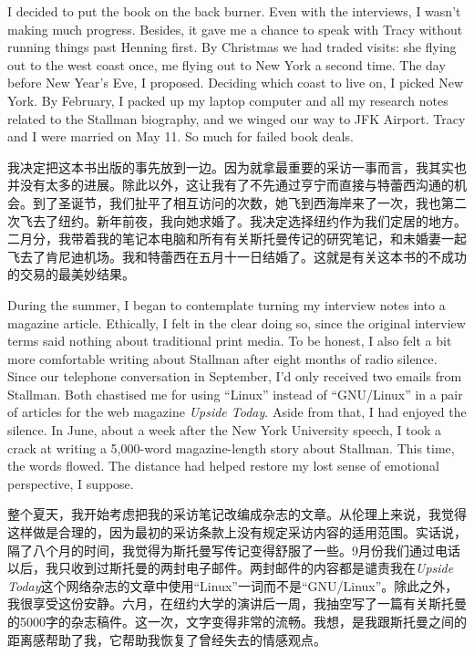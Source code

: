 \ifdefined\eng
I decided to put the book on the back burner. Even with the interviews, I wasn't making much progress. Besides, it gave me a chance to speak with Tracy without running things past Henning first. By Christmas we had traded visits: she flying out to the west coast once, me flying out to New York a second time. The day before New Year's Eve, I proposed. Deciding which coast to live on, I picked New York. By February, I packed up my laptop computer and all my research notes related to the Stallman biography, and we winged our way to JFK Airport. Tracy and I were married on May 11. So much for failed book deals.
\fi

\ifdefined\chs
我决定把这本书出版的事先放到一边。因为就拿最重要的采访一事而言，我其实也并没有太多的进展。除此以外，这让我有了不先通过亨宁而直接与特蕾西沟通的机会。到了圣诞节，我们扯平了相互访问的次数，她飞到西海岸来了一次，我也第二次飞去了纽约。新年前夜，我向她求婚了。我决定选择纽约作为我们定居的地方。二月分，我带着我的笔记本电脑和所有有关斯托曼传记的研究笔记，和未婚妻一起飞去了肯尼迪机场。我和特蕾西在五月十一日结婚了。这就是有关这本书的不成功的交易的最美妙结果。
\fi

\ifdefined\eng
During the summer, I began to contemplate turning my interview notes into a magazine article. Ethically, I felt in the clear doing so, since the original interview terms said nothing about traditional print media. To be honest, I also felt a bit more comfortable writing about Stallman after eight months of radio silence. Since our telephone conversation in September, I'd only received two emails from Stallman. Both chastised me for using ``Linux'' instead of ``GNU/Linux'' in a pair of articles for the web magazine \textit{Upside Today}. Aside from that, I had enjoyed the silence. In June, about a week after the New York University speech, I took a crack at writing a 5,000-word magazine-length story about Stallman. This time, the words flowed. The distance had helped restore my lost sense of emotional perspective, I suppose.
\fi

\ifdefined\chs
整个夏天，我开始考虑把我的采访笔记改编成杂志的文章。从伦理上来说，我觉得这样做是合理的，因为最初的采访条款上没有规定采访内容的适用范围。实话说，隔了八个月的时间，我觉得为斯托曼写传记变得舒服了一些。9月份我们通过电话以后，我只收到过斯托曼的两封电子邮件。两封邮件的内容都是谴责我在\textit{Upside Today}这个网络杂志的文章中使用“Linux”一词而不是“GNU/Linux”。除此之外，我很享受这份安静。六月，在纽约大学的演讲后一周，我抽空写了一篇有关斯托曼的5000字的杂志稿件。这一次，文字变得非常的流畅。我想，是我跟斯托曼之间的距离感帮助了我，它帮助我恢复了曾经失去的情感观点。
\fi

